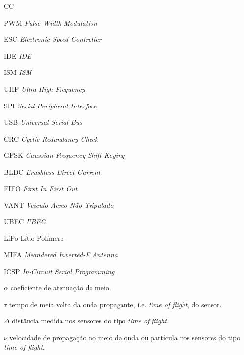 \documentclass[
  	11pt,%
 	openright,%
 	twoside,%
 	a4paper,%
 	english,%
 	brazil %
 	]{abntex2}
\begin{document}


\listoffigures*
\cleardoublepage

\listoftables*
\cleardoublepage

\begin{siglas}
  \item[CC]
  \item[PWM] \textit{Pulse Width Modulation}
  \item[ESC] \textit{Electronic Speed Controller}
  \item[IDE] \textit{IDE}
  \item[ISM] \textit{ISM}
  \item[UHF] \textit{Ultra High Frequency}
  \item[SPI] \textit{Serial Peripheral Interface} %
  \item[USB] \textit{Universal Serial Bus}
  \item[CRC] \textit{Cyclic Redundancy Check}
  \item[GFSK] \textit{Gaussian Frequency Shift Keying} %
  \item[BLDC] \textit{Brushless Direct Current}
  \item[FIFO] \textit{First In First Out}
  \item[VANT] \textit{Veículo Aereo Não Tripulado}
  \item[UBEC] \textit{UBEC}
  \item[LiPo] Lítio Polímero
  \item[MIFA] \textit{Meandered Inverted-F Antenna}
  \item[ICSP] \textit{In-Circuit Serial Programming}
\end{siglas}

\begin{simbolos}
  \item[$ \alpha $] coeficiente de atenuação do meio.
  \item[$ \tau $] tempo de meia volta da onda propagante, i.e. \textit{time of flight}, do sensor.
  \item[$ \Delta $] distância medida nos sensores do tipo \textit{time of flight}.
  \item[$ \nu $] velocidade de propagação no meio da onda ou partícula nos sensores do tipo \textit{time of flight}.
\end{simbolos}
\end{document}
